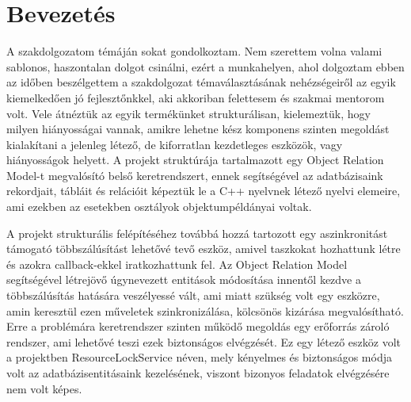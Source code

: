 \chapter {Bevezetés}
\label{ch:intro}

A szakdolgozatom témáján sokat gondolkoztam. Nem szerettem volna valami sablonos, haszontalan dolgot csinálni, ezért a munkahelyen, ahol dolgoztam ebben az időben beszélgettem a szakdolgozat témaválasztásának nehézségeiről az egyik kiemelkedően jó fejlesztőnkkel, aki akkoriban felettesem és szakmai mentorom volt. Vele átnéztük az egyik termékünket strukturálisan, kielemeztük, hogy milyen hiányosságai vannak, amikre lehetne kész komponens szinten megoldást kialakítani a jelenleg létező, de kiforratlan kezdetleges eszközök, vagy hiányosságok helyett. A projekt struktúrája tartalmazott egy Object Relation Model-t megvalósító belső keretrendszert, ennek segítségével az adatbázisaink rekordjait, tábláit és relációit képeztük le a C++\cite{cpp_docs} nyelvnek létező nyelvi elemeire, ami ezekben az esetekben osztályok objektumpéldányai voltak.

A projekt strukturális felépítéséhez továbbá hozzá tartozott egy aszinkronitást támogató többszálúsítást lehetővé tevő eszköz, amivel taszkokat hozhattunk létre és azokra callback-ekkel iratkozhattunk fel. Az Object Relation Model segítségével létrejövő úgynevezett entitások módosítása innentől kezdve a többszálúsítás hatására veszélyessé vált, ami miatt szükség volt egy eszközre, amin keresztül ezen műveletek szinkronizálása, kölcsönös kizárása megvalósítható. Erre a problémára keretrendszer szinten működő megoldás egy erőforrás zároló rendszer, ami lehetővé teszi ezek biztonságos elvégzését. Ez egy létező eszköz volt a projektben ResourceLockService néven, mely kényelmes és biztonságos módja volt az adatbázisentitásaink kezelésének, viszont bizonyos feladatok elvégzésére nem volt képes.

